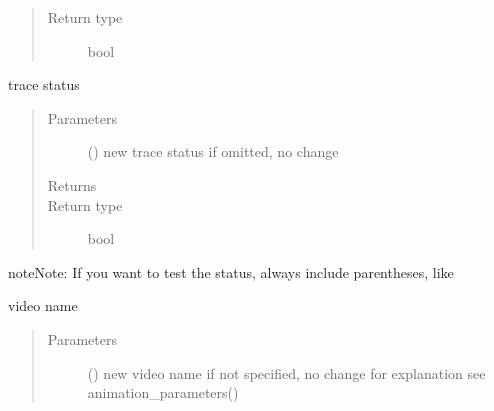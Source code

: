 \documentclass[letterpaper,10pt,english]{sphinxmanual}
\begin{document}
\begin{fulllineitems}
\begin{fulllineitems}
\begin{quote}
\begin{description}
\item[{Return type}] \leavevmode
bool

\end{description}\end{quote}

\end{fulllineitems}


\begin{fulllineitems}
\label{\detokenize{Reference:salabim.Environment.trace}}
trace status
\begin{quote}\begin{description}
\item[{Parameters}] \leavevmode
{} () \textendash{} new trace status 
if omitted, no change

\item[{Returns}] \leavevmode
{}

\item[{Return type}] \leavevmode
bool

\end{description}\end{quote}

\begin{sphinxadmonition}{note}{Note:}
If you want to test the status, always include
parentheses, like
\begin{quote}

\end{quote}
\end{sphinxadmonition}

\end{fulllineitems}


\begin{fulllineitems}
\label{\detokenize{Reference:salabim.Environment.video}}
video name
\begin{quote}\begin{description}
\item[{Parameters}] \leavevmode
{} (\sphinxstyleliteralemphasis{, }) \textendash{} new video name 
if not specified, no change 
for explanation see animation\_parameters()


\end{description}
\end{quote}
\end{fulllineitems}
\end{fulllineitems}
\end{document}

